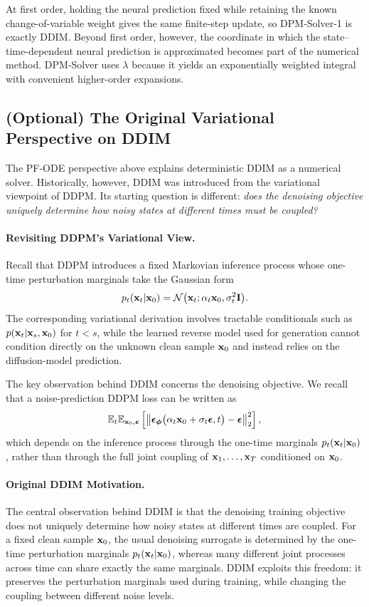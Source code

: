 At first order, holding the neural prediction fixed while retaining the known
change-of-variable weight gives the same finite-step update, so
DPM-Solver-1 is exactly DDIM. Beyond first order, however, the coordinate in
which the state--time-dependent neural prediction is approximated becomes part
of the numerical method. DPM-Solver uses $\lambda$ because it yields an
exponentially weighted integral with convenient higher-order expansions.



\subsection{(Optional) The Original Variational Perspective on DDIM}\label{subsec:ddim}

The PF-ODE perspective above explains deterministic DDIM as a numerical
solver. Historically, however, DDIM was introduced from the variational
viewpoint of DDPM. Its starting question is different:
\emph{does the denoising objective uniquely determine how noisy states at
different times must be coupled?}

\paragraph{Revisiting DDPM's Variational View.}
Recall that DDPM introduces a fixed Markovian inference process whose
one-time perturbation marginals take the Gaussian form
\[
p_t({\mathbf{x}}_t|{\mathbf{x}}_0)
=
\mathcal N
\bigl(
{\mathbf{x}}_t;
\alpha_t{\mathbf{x}}_0,
\sigma_t^2{\mathbf{I}}
\bigr).
\]
The corresponding variational derivation involves tractable conditionals
such as
$p({\mathbf{x}}_t|{\mathbf{x}}_s,{\mathbf{x}}_0)$ for $t<s$, while the learned reverse model used
for generation cannot condition directly on the unknown clean sample
${\mathbf{x}}_0$ and instead relies on the diffusion-model prediction.

The key observation behind DDIM concerns the denoising objective. We recall that a noise-prediction DDPM loss can be written as
\[
\mathbb{E}_t
\mathbb{E}_{{\mathbf{x}}_0,{\bm{\epsilon}}}
\left[
\left\|
{\bm{\epsilon}}_{\bm{\phi}}
\bigl(
\alpha_t{\mathbf{x}}_0+\sigma_t{\bm{\epsilon}},t
\bigr)
-
{\bm{\epsilon}}
\right\|_2^2
\right],
\]
which depends on the inference process through the one-time marginals
$p_t({\mathbf{x}}_t|{\mathbf{x}}_0)$, rather than through the full joint coupling of
${\mathbf{x}}_1,\ldots,{\mathbf{x}}_T$ conditioned on ${\mathbf{x}}_0$.


\paragraph{Original DDIM Motivation.}
The central observation behind DDIM is that the denoising training objective
does not uniquely determine how noisy states at different times are coupled.
For a fixed clean sample ${\mathbf{x}}_0$, the usual denoising surrogate is determined
by the one-time perturbation marginals
$p_t({\mathbf{x}}_t|{\mathbf{x}}_0)$, whereas many different joint processes across time can
share exactly the same marginals. DDIM exploits this freedom: it preserves
the perturbation marginals used during training, while changing the coupling
between different noise levels.

